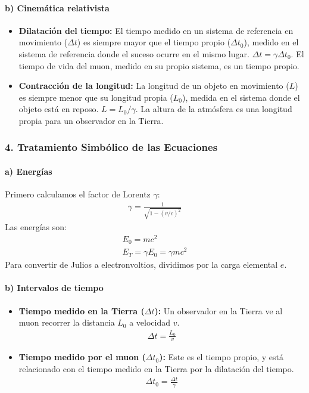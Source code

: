 \paragraph*{b) Cinemática relativista}
\begin{itemize}
    \item \textbf{Dilatación del tiempo:} El tiempo medido en un sistema de referencia en movimiento ($\Delta t$) es siempre mayor que el tiempo propio ($\Delta t_0$), medido en el sistema de referencia donde el suceso ocurre en el mismo lugar. $\Delta t = \gamma \Delta t_0$. El tiempo de vida del muon, medido en su propio sistema, es un tiempo propio.
    \item \textbf{Contracción de la longitud:} La longitud de un objeto en movimiento ($L$) es siempre menor que su longitud propia ($L_0$), medida en el sistema donde el objeto está en reposo. $L = L_0 / \gamma$. La altura de la atmósfera es una longitud propia para un observador en la Tierra.
\end{itemize}

\subsubsection*{4. Tratamiento Simbólico de las Ecuaciones}
\paragraph*{a) Energías}
Primero calculamos el factor de Lorentz $\gamma$:
\begin{gather}
    \gamma = \frac{1}{\sqrt{1-(v/c)^2}}
\end{gather}
Las energías son:
\begin{gather}
    E_0 = mc^2 \\
    E_T = \gamma E_0 = \gamma mc^2
\end{gather}
Para convertir de Julios a electronvoltios, dividimos por la carga elemental $e$.

\paragraph*{b) Intervalos de tiempo}
\begin{itemize}
    \item \textbf{Tiempo medido en la Tierra ($\Delta t$):} Un observador en la Tierra ve al muon recorrer la distancia $L_0$ a velocidad $v$.
        \begin{gather} \Delta t = \frac{L_0}{v} \end{gather}
    \item \textbf{Tiempo medido por el muon ($\Delta t_0$):} Este es el tiempo propio, y está relacionado con el tiempo medido en la Tierra por la dilatación del tiempo.
        \begin{gather} \Delta t_0 = \frac{\Delta t}{\gamma} \end{gather}
\end{itemize}


